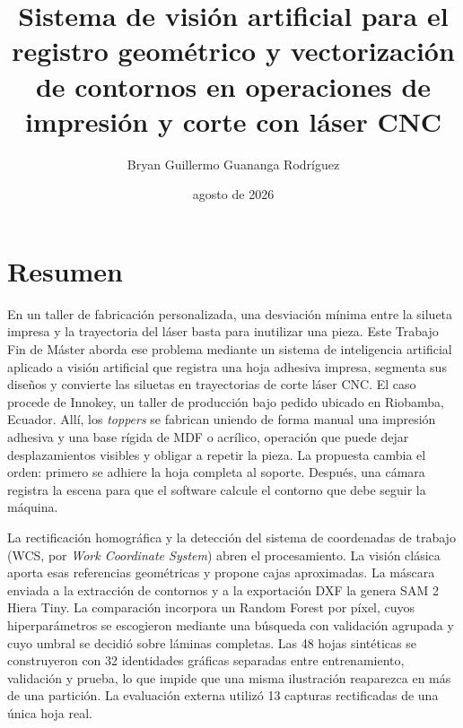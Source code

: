 \documentclass[11pt,a4paper,spanish]{book}
\title{Sistema de visión artificial para el registro geométrico y vectorización de contornos en operaciones de impresión y corte con láser CNC}
\author{Bryan Guillermo Guananga Rodríguez}
\date{agosto de 2026}
\numberwithin{equation}{chapter}
\begin{document}
\hypersetup{pageanchor=false}
\renewcommand{\listfigurename}{Índice de Figuras}
\renewcommand{\listtablename}{Índice de Tablas}
\renewcommand{\contentsname}{Índice de Contenidos}
\renewcommand{\figurename}{Figura}
\renewcommand{\tablename}{Tabla}

\maketitle

\frontmatter
\hypersetup{pageanchor=true}
\tableofcontents
\begingroup
\makeatletter
\renewcommand*{\l@figure}{\@dottedtocline{1}{1.5em}{6.5em}}
\renewcommand{\numberline}[1]{\hb@xt@\@tempdima{Figura~#1.\hfil}}
\listoffigures
\makeatother
\endgroup
\begingroup
\makeatletter
\renewcommand*{\l@table}{\@dottedtocline{1}{1.5em}{6.0em}}
\renewcommand{\numberline}[1]{\hb@xt@\@tempdima{Tabla~#1.\hfil}}
\listoftables
\makeatother
\endgroup

\chapter*{Resumen}
En un taller de fabricación personalizada, una desviación mínima entre la silueta impresa y la trayectoria del láser basta para inutilizar una pieza. Este Trabajo Fin de Máster aborda ese problema mediante un sistema de inteligencia artificial aplicado a visión artificial que registra una hoja adhesiva impresa, segmenta sus diseños y convierte las siluetas en trayectorias de corte láser CNC. El caso procede de Innokey, un taller de producción bajo pedido ubicado en Riobamba, Ecuador. Allí, los \textit{toppers} se fabrican uniendo de forma manual una impresión adhesiva y una base rígida de MDF o acrílico, operación que puede dejar desplazamientos visibles y obligar a repetir la pieza. La propuesta cambia el orden: primero se adhiere la hoja completa al soporte. Después, una cámara registra la escena para que el software calcule el contorno que debe seguir la máquina.

La rectificación homográfica y la detección del sistema de coordenadas de trabajo (WCS, por \textit{Work Coordinate System}) abren el procesamiento. La visión clásica aporta esas referencias geométricas y propone cajas aproximadas. La máscara enviada a la extracción de contornos y a la exportación DXF la genera SAM 2 Hiera Tiny. La comparación incorpora un Random Forest por píxel, cuyos hiperparámetros se escogieron mediante una búsqueda con validación agrupada y cuyo umbral se decidió sobre láminas completas. Las 48 hojas sintéticas se construyeron con 32 identidades gráficas separadas entre entrenamiento, validación y prueba, lo que impide que una misma ilustración reaparezca en más de una partición. La evaluación externa utilizó 13 capturas rectificadas de una única hoja real.
\end{document}

